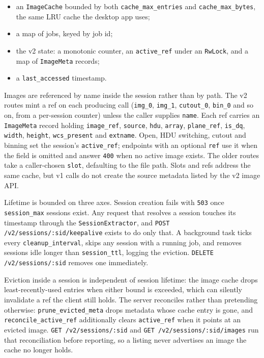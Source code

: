 \documentclass[11pt,a4paper]{article}
\newcommand{\code}[1]{\texttt{\small #1}}
\begin{document}
    \begin{itemize}[nosep]
        \item an \code{ImageCache} bounded by both \code{cache\_max\_entries} and \code{cache\_max\_bytes}, the same LRU cache the desktop app uses;
        \item a map of jobs, keyed by job id;
        \item the v2 state: a monotonic counter, an \code{active\_ref} under an \code{RwLock}, and a map of \code{ImageMeta} records;
        \item a \code{last\_accessed} timestamp.
    \end{itemize}

    Images are referenced by name inside the session rather than by path. The v2 routes mint a ref on each producing call (\code{img\_0}, \code{img\_1}, \code{cutout\_0}, \code{bin\_0} and so on, from a per-session counter) unless the caller supplies \code{name}. Each ref carries an \code{ImageMeta} record holding \code{image\_ref}, \code{source}, \code{hdu}, \code{array}, \code{plane\_ref}, \code{is\_dq}, \code{width}, \code{height}, \code{wcs\_present} and \code{extname}. Open, HDU switching, cutout and binning set the session's \code{active\_ref}; endpoints with an optional \code{ref} use it when the field is omitted and answer \code{400} when no active image exists. The older routes take a caller-chosen \code{slot}, defaulting to the file path. Slots and refs address the same cache, but v1 calls do not create the source metadata listed by the v2 image API.

    Lifetime is bounded on three axes. Session creation fails with \code{503} once \code{session\_max} sessions exist. Any request that resolves a session touches its timestamp through the \code{SessionExtractor}, and \code{POST /v2/sessions/:sid/keepalive} exists to do only that. A background task ticks every \code{cleanup\_interval}, skips any session with a running job, and removes sessions idle longer than \code{session\_ttl}, logging the eviction. \code{DELETE /v2/sessions/:sid} removes one immediately.

    Eviction inside a session is independent of session lifetime: the image cache drops least-recently-used entries when either bound is exceeded, which can silently invalidate a ref the client still holds. The server reconciles rather than pretending otherwise: \code{prune\_evicted\_meta} drops metadata whose cache entry is gone, and \code{reconcile\_active\_ref} additionally clears \code{active\_ref} when it points at an evicted image. \code{GET /v2/sessions/:sid} and \code{GET /v2/sessions/:sid/images} run that reconciliation before reporting, so a listing never advertises an image the cache no longer holds.
\end{document}
